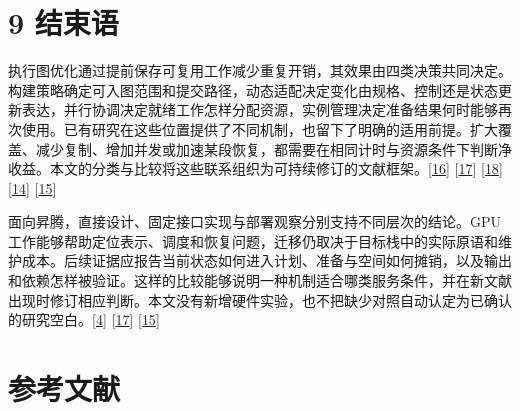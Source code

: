 \documentclass[
  11pt,
  UTF8]{ctexart}
\begin{document}
\hypertarget{section-9}{%
\section{9 结束语}\label{section-9}}

执行图优化通过提前保存可复用工作减少重复开销，其效果由四类决策共同决定。构建策略确定可入图范围和提交路径，动态适配决定变化由规格、控制还是状态更新表达，并行协调决定就绪工作怎样分配资源，实例管理决定准备结果何时能够再次使用。已有研究在这些位置提供了不同机制，也留下了明确的适用前提。扩大覆盖、减少复制、增加并发或加速某段恢复，都需要在相同计时与资源条件下判断净收益。本文的分类与比较将这些联系组织为可持续修订的文献框架。{[}\protect\hyperlink{ref-ghosh2026grace}{16}{]}
{[}\protect\hyperlink{ref-ye2025flashinfer}{17}{]}
{[}\protect\hyperlink{ref-cheng2026mpk}{18}{]}
{[}\protect\hyperlink{ref-zeng2025medusa}{14}{]}
{[}\protect\hyperlink{ref-liu2026foundry}{15}{]}

面向昇腾，直接设计、固定接口实现与部署观察分别支持不同层次的结论。GPU工作能够帮助定位表示、调度和恢复问题，迁移仍取决于目标栈中的实际原语和维护成本。后续证据应报告当前状态如何进入计划、准备与空间如何摊销，以及输出和依赖怎样被验证。这样的比较能够说明一种机制适合哪类服务条件，并在新文献出现时修订相应判断。本文没有新增硬件实验，也不把缺少对照自动认定为已确认的研究空白。{[}\protect\hyperlink{ref-liu2025xllm}{4}{]}
{[}\protect\hyperlink{ref-ye2025flashinfer}{17}{]}
{[}\protect\hyperlink{ref-liu2026foundry}{15}{]}

\hypertarget{references}{%
\section*{参考文献}\label{references}}
\end{document}

